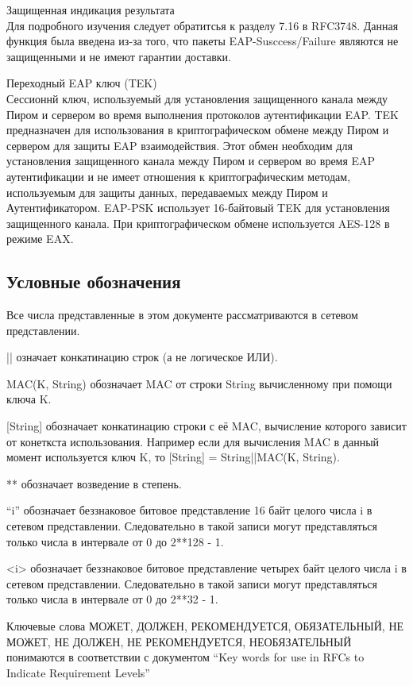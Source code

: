 Защищенная индикация результата \\ Для подробного изучения следует обратитсья к разделу 7.16 в RFC3748. Данная функция была введена из-за того, что пакеты EAP-Susccess/Failure являются не защищенными и не имеют гарантии доставки.

Переходный EAP ключ (TEK) \\ Сессионнй ключ, используемый для установления защищенного канала между Пиром и сервером во время выполнения протоколов аутентификации EAP. TEK предназначен для использования в криптографическом обмене между Пиром и сервером для защиты EAP взаимодействия. Этот обмен необходим для установления защищенного канала между Пиром и сервером во время EAP аутентификации и не имеет отношения к криптографическим методам, используемым для защиты данных, передаваемых между Пиром и Аутентификатором. EAP-PSK использует 16-байтовый TEK для установления защищенного канала. При криптографическом обмене используется AES-128 в режиме EAX.

\subsection{Условные обозначения}

Все числа представленные в этом документе рассматриваются в сетевом представлении.

|| означает конкатинацию строк (а не логическое ИЛИ).

MAC(K, String) обозначает MAC от строки String вычисленному при помощи ключа K.

[String] обозначает конкатинацию строки с её MAC, вычисление которого зависит от конеткста использования. Например если для вычисления MAC в данный момент используется ключ K, то [String] = String||MAC(K, String).

** обозначает возведение в степень.

``i'' обозначает беззнаковое битовое представление 16 байт целого числа i в сетевом представлении. Следовательно в такой записи могут представляться только числа в интервале от 0 до 2**128 - 1.

<i> обозначает беззнаковое битовое представление четырех байт целого числа i в сетевом представлении. Следовательно в такой записи могут представляться только числа в интервале от 0 до 2**32 - 1.

Ключевые слова МОЖЕТ, ДОЛЖЕН, РЕКОМЕНДУЕТСЯ, ОБЯЗАТЕЛЬНЫЙ, НЕ МОЖЕТ, НЕ ДОЛЖЕН, НЕ РЕКОМЕНДУЕТСЯ, НЕОБЯЗАТЕЛЬНЫЙ понимаются в соответствии с документом ``Key words for use in RFCs to Indicate Requirement Levels''



